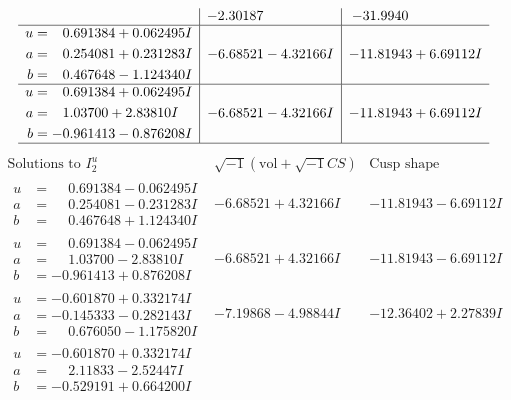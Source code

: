 \documentclass[1p]{elsarticle_modified}
\theoremstyle{definition}
\newcommand{\I}{\sqrt{-1}}
\begin{document}
$$\begin{array}{c|c|c}
 & -2.30187\phantom{ +0.000000I} & -31.9940\phantom{ +0.000000I} \\ \hline\begin{aligned}
u &= \phantom{-}0.691384 + 0.062495 I \\
a &= \phantom{-}0.254081 + 0.231283 I \\
b &= \phantom{-}0.467648 - 1.124340 I\end{aligned}
 & -6.68521 - 4.32166 I & -11.81943 + 6.69112 I \\ \hline\begin{aligned}
u &= \phantom{-}0.691384 + 0.062495 I \\
a &= \phantom{-}1.03700 + 2.83810 I \\
b &= -0.961413 - 0.876208 I\end{aligned}
 & -6.68521 - 4.32166 I & -11.81943 + 6.69112 I\\
 \hline 
 \end{array}$$\newpage$$\begin{array}{c|c|c}  
\text{Solutions to }I^u_{2}& \I (\text{vol} + \sqrt{-1}CS) & \text{Cusp shape}\\
 \hline 
\begin{aligned}
u &= \phantom{-}0.691384 - 0.062495 I \\
a &= \phantom{-}0.254081 - 0.231283 I \\
b &= \phantom{-}0.467648 + 1.124340 I\end{aligned}
 & -6.68521 + 4.32166 I & -11.81943 - 6.69112 I \\ \hline\begin{aligned}
u &= \phantom{-}0.691384 - 0.062495 I \\
a &= \phantom{-}1.03700 - 2.83810 I \\
b &= -0.961413 + 0.876208 I\end{aligned}
 & -6.68521 + 4.32166 I & -11.81943 - 6.69112 I \\ \hline\begin{aligned}
u &= -0.601870 + 0.332174 I \\
a &= -0.145333 - 0.282143 I \\
b &= \phantom{-}0.676050 - 1.175820 I\end{aligned}
 & -7.19868 - 4.98844 I & -12.36402 + 2.27839 I \\ \hline\begin{aligned}
u &= -0.601870 + 0.332174 I \\
a &= \phantom{-}2.11833 - 2.52447 I \\
b &= -0.529191 + 0.664200 I\end{aligned}

\end{array}$$
\end{document}

